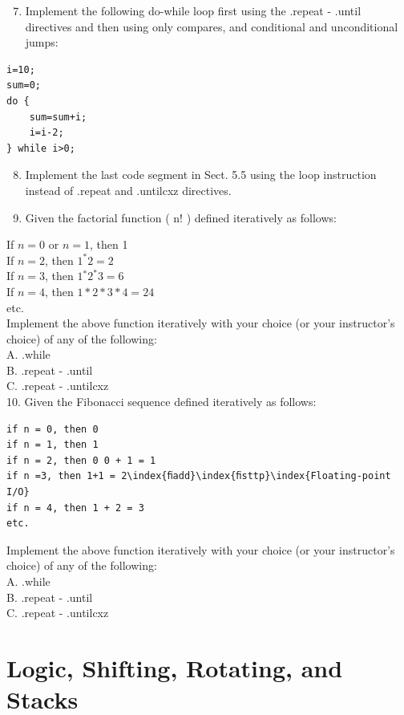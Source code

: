 \documentclass[10pt]{book}
\begin{document}
\begin{enumerate}
  \setcounter{enumi}{6}
  \item Implement the following do-while loop first using the .repeat - .until directives and then using only compares, and conditional and unconditional jumps:
\end{enumerate}

\begin{verbatim}
i=10;
sum=0;
do {
    sum=sum+i;
    i=i-2;
} while i>0;
\end{verbatim}

\begin{enumerate}
  \setcounter{enumi}{7}
  \item Implement the last code segment in Sect. 5.5 using the loop instruction instead of .repeat and .untilcxz directives.
  \item Given the factorial function ( $\mathrm{n}!$ ) defined iteratively as follows:
\end{enumerate}


If $n=0$ or $n=1$, then 1\\
If $n=2$, then $1^{*} 2=2$\\
If $n=3$, then $1{ }^{*} 2^{*} 3=6$\\
If $n=4$, then $1 * 2 * 3 * 4=24$\\
etc.\\
Implement the above function iteratively with your choice (or your instructor's choice) of any of the following:\\
A. .while\\
B. .repeat - .until\\
C. .repeat - .untilcxz\\
10. Given the Fibonacci sequence defined iteratively as follows:

\begin{verbatim}
if n = 0, then 0
if n = 1, then 1
if n = 2, then 0 0 + 1 = 1
if n =3, then 1+1 = 2\index{ﬁadd}\index{ﬁsttp}\index{Floating-point I/O}
if n = 4, then 1 + 2 = 3
etc.
\end{verbatim}

Implement the above function iteratively with your choice (or your instructor's choice) of any of the following:\\
A. .while\\
B. .repeat - .until\\
C. .repeat - .untilcxz

\chapter{Logic, Shifting, Rotating, and Stacks}
\end{document}
